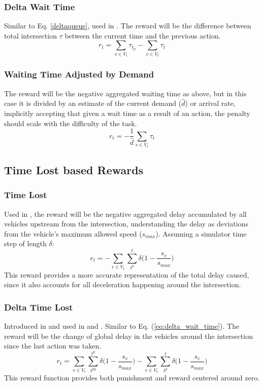 \documentclass{article}
\begin{document}
\subsubsection{Delta Wait Time}
Similar to Eq. \ref{deltaqueue}, used in \cite{liang2018}. The reward will be the difference between total intersection $\tau$ between the current time and the previous action. 
\begin{equation}
r_t =  \sum_{v \in V_t} \tau_{t_p} -  \sum_{v \in V_t} \tau_{t}
\label{eq:delta_wait_time}
\end{equation}

\subsubsection{Waiting Time Adjusted by Demand}
The reward will be the negative aggregated waiting time as above, but in this case it is divided by an estimate of the current demand ($\hat{d}$) or arrival rate, implicitly accepting that given a wait time as a result of an action, the penalty should scale with the difficulty of the task.
\begin{equation}
   r_t = -\frac{1}{\hat{d}} \sum_{v \in V_t} \tau_{t}
\label{eq:wait_time_norm} 
\end{equation}

\subsection{Time Lost based Rewards}
\subsubsection{Time Lost}
Used in \cite{wan2018}, the reward will be the negative aggregated delay accumulated by all vehicles upstream from the intersection, understanding the delay as deviations from the vehicle's maximum allowed speed ($s_{max}$). 
Assuming a simulator time step of length $\delta$:
\begin{equation}
    r_t = - \sum_{v \in V_t}  \sum_{t^p}^t \delta \big( 1-\frac{s_v}{s_{max}} \big)
\label{eq:delay}
\end{equation}
This reward provides a more accurate representation of the total delay caused, since it also accounts for all deceleration happening around the intersection. 

\subsubsection{Delta Time Lost}
Introduced in \cite{abdulhai2010} and used in \cite{mannion} \cite{genders2016} \cite{gao2017} \cite{mousavi2017} and \cite{genders2018}.
Similar to Eq. (\ref{eq:delta_wait_time}).
The reward will be the change of global delay in the vehicles around the intersection since the last action was taken.
\begin{equation}
   r_t = \sum_{v \in V_t}  \sum_{t^{pp}}^{t^p} \delta  \big( 1-\frac{s_v}{s_{max}} \big) - \sum_{v \in V_t}  \sum_{t^p}^t \delta  \big( 1-\frac{s_v}{s_{max}} \big)
\label{eq:changedelay} 
\end{equation}
This reward function provides both punishment and reward centered around zero.
\end{document}
